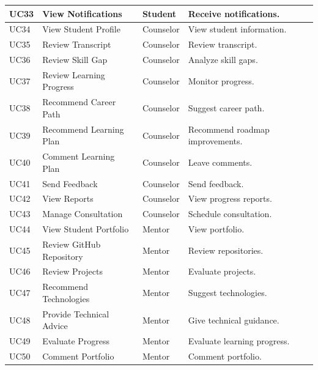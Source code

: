 \begin{longtable}{|>{\centering\arraybackslash}p{1cm}|p{4cm}|p{3.3cm}|p{7.2cm}|}
UC33 &
View Notifications &
Student &
Receive notifications.
\\
\hline

UC34 &
View Student Profile &
Counselor &
View student information.
\\
\hline

UC35 &
Review Transcript &
Counselor &
Review transcript.
\\
\hline

UC36 &
Review Skill Gap &
Counselor &
Analyze skill gaps.
\\
\hline

UC37 &
Review Learning Progress &
Counselor &
Monitor progress.
\\
\hline

UC38 &
Recommend Career Path &
Counselor &
Suggest career path.
\\
\hline

UC39 &
Recommend Learning Plan &
Counselor &
Recommend roadmap improvements.
\\
\hline

UC40 &
Comment Learning Plan &
Counselor &
Leave comments.
\\
\hline

UC41 &
Send Feedback &
Counselor &
Send feedback.
\\
\hline

UC42 &
View Reports &
Counselor &
View progress reports.
\\
\hline

UC43 &
Manage Consultation &
Counselor &
Schedule consultation.
\\
\hline

UC44 &
View Student Portfolio &
Mentor &
View portfolio.
\\
\hline

UC45 &
Review GitHub Repository &
Mentor &
Review repositories.
\\
\hline

UC46 &
Review Projects &
Mentor &
Evaluate projects.
\\
\hline

UC47 &
Recommend Technologies &
Mentor &
Suggest technologies.
\\
\hline

UC48 &
Provide Technical Advice &
Mentor &
Give technical guidance.
\\
\hline

UC49 &
Evaluate Progress &
Mentor &
Evaluate learning progress.
\\
\hline

UC50 &
Comment Portfolio &
Mentor &
Comment portfolio.
\\
\hline


\end{longtable}
